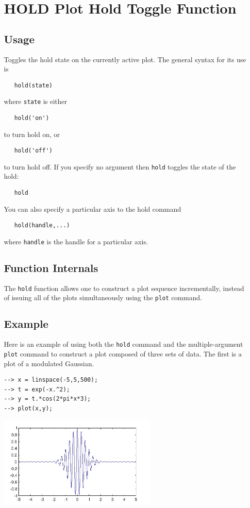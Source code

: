 \section{HOLD Plot Hold Toggle Function}

\subsection{Usage}

Toggles the hold state on the currently active plot.  The
general syntax for its use is
\begin{verbatim}
   hold(state)
\end{verbatim}
where \verb|state| is either
\begin{verbatim}
   hold('on')
\end{verbatim}
to turn hold on, or
\begin{verbatim}
   hold('off')
\end{verbatim}
to turn hold off. If you specify no argument then
\verb|hold| toggles the state of the hold:
\begin{verbatim}
   hold
\end{verbatim}
You can also specify a particular axis to the hold command
\begin{verbatim}
   hold(handle,...)
\end{verbatim}
where \verb|handle| is the handle for a particular axis.
\subsection{Function Internals}

The \verb|hold| function allows one to construct a plot sequence
incrementally, instead of issuing all of the plots simultaneously
using the \verb|plot| command.
\subsection{Example}

Here is an example of using both the \verb|hold| command and the
multiple-argument \verb|plot| command to construct a plot composed
of three sets of data.  The first is a plot of a modulated Gaussian.
\begin{verbatim}
--> x = linspace(-5,5,500);
--> t = exp(-x.^2);
--> y = t.*cos(2*pi*x*3);
--> plot(x,y);
\end{verbatim}


\centerline{\includegraphics[width=8cm]{hold1}}


